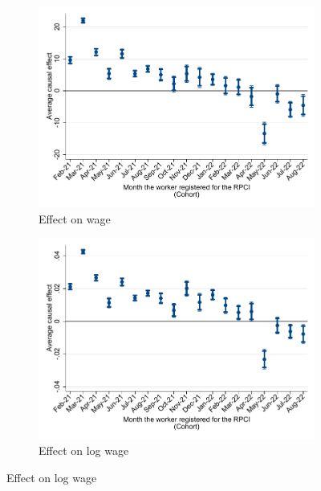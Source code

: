 \documentclass[oneside,11pt]{article}
\begin{document}
\begin{figure}[H]
    \caption{RPCI effect by cohort}
    \label{twfe_beta_cohort}
    \begin{center}
    
    \begin{subfigure}{0.49\textwidth}
    \caption{Effect on wage}
    \includegraphics[width=\textwidth]{04_Figures/muestra_10porciento/twfe_beta_cohort_sal_cierre.pdf}
    \end{subfigure}
    \begin{subfigure}{0.49\textwidth}
    \caption{Effect on log wage}
    \includegraphics[width=\textwidth]{04_Figures/muestra_10porciento/twfe_beta_cohort_log_sal_cierre.pdf}
    \end{subfigure}
    
    \end{center}
\end{figure}
\end{document}
